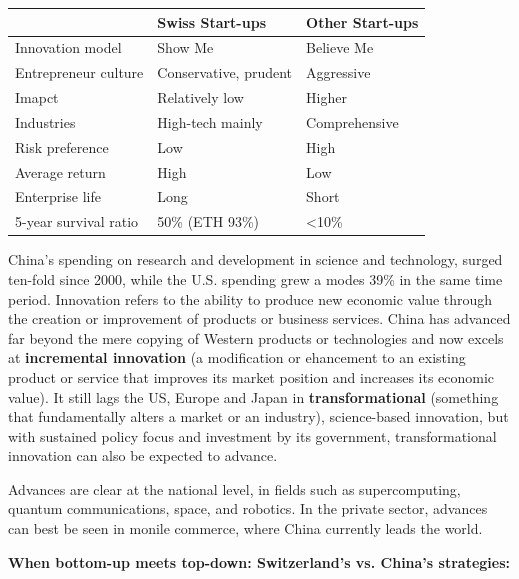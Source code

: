 \documentclass[a4paper]{extarticle}
\begin{document}
\begin{table}[H]
    \begin{tabular}{l|l|l|}
                          & Swiss Start-ups       & Other Start-ups \\ \hline
    Innovation model      & Show Me               & Believe Me      \\ \hline
    Entrepreneur culture  & Conservative, prudent & Aggressive      \\ \hline
    Imapct                & Relatively low        & Higher          \\ \hline
    Industries            & High-tech mainly      & Comprehensive   \\ \hline
    Risk preference       & Low                   & High            \\ \hline
    Average return        & High                  & Low             \\ \hline
    Enterprise life       & Long                  & Short           \\ \hline
    5-year survival ratio & 50\% (ETH 93\%)       & \textless 10\%  \\ \hline
    \end{tabular}
\end{table}

China's spending on research and development in science and technology, surged ten-fold since 2000, while the U.S. spending grew a modes 39\% in the same time period. Innovation refers to the ability to produce new economic value through the creation or improvement of products or business services. China has advanced far beyond the mere copying of Western products or technologies and now excels at \textbf{incremental innovation} (a modification or ehancement to an existing product or service that improves its market position and increases its economic value). It still lags the US, Europe and Japan in \textbf{transformational} (something that fundamentally alters a market or an industry), science-based innovation, but with sustained policy focus and investment by its government, transformational innovation can also be expected to advance.

Advances are clear at the national level, in fields such as supercomputing, quantum communications, space, and robotics. In the private sector, advances can best be seen in monile commerce, where China currently leads the world.

\textbf{When bottom-up meets top-down: Switzerland's vs. China's strategies:}
\end{document}
